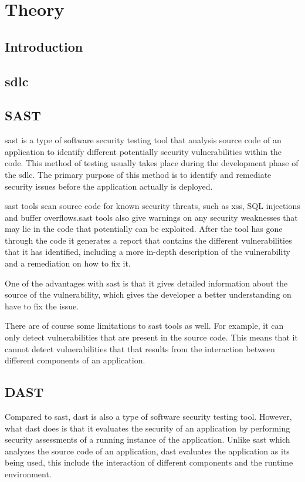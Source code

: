 \section{Theory}
\subsection{Introduction}
\subsection{\acrlong{sdlc}}

\subsection{SAST}
\acrlong{sast} is a type of software security testing tool that analysis source code of an application to identify different potentially security vulnerabilities within the code. This method of testing usually takes place during the development phase of the \acrlong{sdlc}. The primary purpose of this method is to identify and remediate security issues before the application actually is deployed. \cite{sast}

\acrshort{sast} tools scan source code for known security threats, such as \acrlong{xss}, SQL injections and buffer overflows.\acrshort{sast} tools also give warnings on any security weaknesses that may lie in the code that potentially can be exploited. After the tool has gone through the code it generates a report that contains the different vulnerabilities that it has identified, including a more in-depth description of the vulnerability and a remediation on how to fix it. 

One of the advantages with \acrshort{sast} is that it gives detailed information about the source of the vulnerability, which gives the developer a better understanding on have to fix the issue. 

There are of course some limitations to \acrshort{sast} tools as well. For example, it can only detect vulnerabilities that are present in the source code. This means that it cannot detect vulnerabilities that that results from the interaction between different components of an application.


\subsection{DAST}
Compared to \acrlong{sast}, \acrlong{dast} is also a type of software security testing tool. However, what \acrshort{dast} does is that it evaluates the security of an application by performing security assessments of a running instance of the application. Unlike \acrshort{sast} which analyzes the source code of an application, \acrshort{dast} evaluates the application as its being used, this include the interaction of different components and the runtime environment. 

